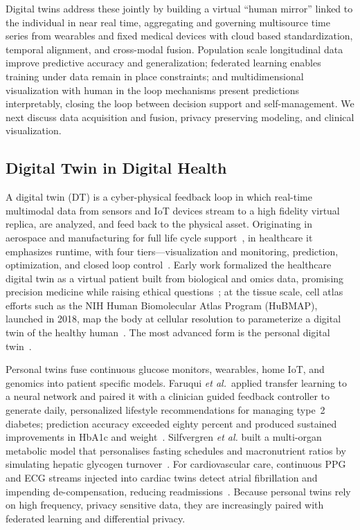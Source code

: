 \documentclass[journal]{IEEEtran}
\begin{document}
Digital twins address these jointly by building a virtual ``human mirror'' linked to the individual in near real time, aggregating and governing multisource time series from wearables and fixed medical devices with cloud based standardization, temporal alignment, and cross-modal fusion. Population scale longitudinal data improve predictive accuracy and generalization; federated learning enables training under data remain in place constraints; and multidimensional visualization with human in the loop mechanisms present predictions interpretably, closing the loop between decision support and self-management. We next discuss data acquisition and fusion, privacy preserving modeling, and clinical visualization.

\subsection{Digital Twin in Digital Health}

A digital twin (DT) is a cyber-physical feedback loop in which real-time multimodal data from sensors and IoT devices stream to a high fidelity virtual replica, are analyzed, and feed back to the physical asset. Originating in aerospace and manufacturing for full life cycle support~\cite{Tao2018}, in healthcare it emphasizes runtime, with four tiers---visualization and monitoring, prediction, optimization, and closed loop control~\cite{NIST2021,sun2023digitaltwin}. Early work formalized the healthcare digital twin as a virtual patient built from biological and omics data, promising precision medicine while raising ethical questions~\cite{Bruynseels2018DigitalTwins}; at the tissue scale, cell atlas efforts such as the NIH Human Biomolecular Atlas Program (HuBMAP), launched in 2018, map the body at cellular resolution to parameterize a digital twin of the healthy human~\cite{HuBMAP2019}. The most advanced form is the personal digital twin~\cite{deKerckhove2021}.

Personal twins fuse continuous glucose monitors, wearables, home IoT, and genomics into patient specific models. Faruqui \emph{et al.}\ applied transfer learning to a neural network and paired it with a clinician guided feedback controller to generate daily, personalized lifestyle recommendations for managing type 2 diabetes; prediction accuracy exceeded eighty percent and produced sustained improvements in HbA1c and weight~\cite{Faruqui2024}. Silfvergren \emph{et al.} built a multi-organ metabolic model that personalises fasting schedules and macronutrient ratios by simulating hepatic glycogen turnover \cite{Silfvergren2022}. For cardiovascular care, continuous PPG and ECG streams injected into cardiac twins detect atrial fibrillation and impending de-compensation, reducing readmissions \cite{Bayoumy2021,Williams2023}. Because personal twins rely on high frequency, privacy sensitive data, they are increasingly paired with federated learning and differential privacy.
\end{document}
